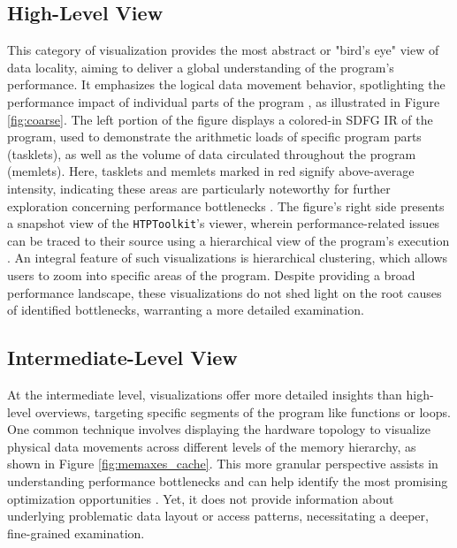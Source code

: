 \subsection{High-Level View}\label{sec:coarse_view}
This category of visualization provides the most abstract or "bird's eye" view of data locality, aiming to deliver a global understanding of the program's performance. It emphasizes the logical data movement behavior, spotlighting the performance impact of individual parts of the program \cite{schaad2021boosting,schaad2022boosting,gimenez2017memaxes,adhianto2010hpctoolkit}, as illustrated in Figure \ref{fig:coarse}. The left portion of the figure displays a colored-in SDFG IR of the program, used to demonstrate the arithmetic loads of specific program parts (tasklets), as well as the volume of data circulated throughout the program (memlets). Here, tasklets and memlets marked in red signify above-average intensity, indicating these areas are particularly noteworthy for further exploration concerning performance bottlenecks \cite{schaad2021boosting}. The figure's right side presents a snapshot view of the \texttt{HTPToolkit}'s viewer, wherein performance-related issues can be traced to their source using a hierarchical view of the program's execution \cite{adhianto2010hpctoolkit}. An integral feature of such visualizations is hierarchical clustering, which allows users to zoom into specific areas of the program. Despite providing a broad performance landscape, these visualizations do not shed light on the root causes of identified bottlenecks, warranting a more detailed examination.

\subsection{Intermediate-Level View}\label{sec:medium_view}
At the intermediate level, visualizations offer more detailed insights than high-level overviews, targeting specific segments of the program like functions or loops. One common technique involves displaying the hardware topology to visualize physical data movements across different levels of the memory hierarchy, as shown in Figure \ref{fig:memaxes_cache}. This more granular perspective assists in understanding performance bottlenecks and can help identify the most promising optimization opportunities \cite{gimenez2017memaxes,choudhury2011abstract}. Yet, it does not provide information about underlying problematic data layout or access patterns, necessitating a deeper, fine-grained examination.

